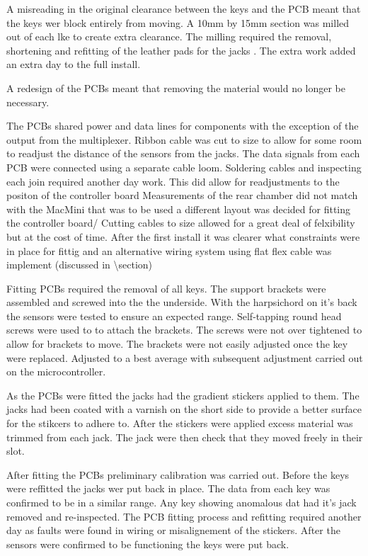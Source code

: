 A misreading in the original clearance between the keys and the PCB
meant that the keys wer block entirely from moving. A 10mm by 15mm
section was milled out of each lke \FIGURE to create extra clearance.
The milling required the removal, shortening and refitting of the
leather pads for the jacks \FIGURE. The extra work added an extra day to
the full install.

A redesign of the PCBs meant that removing the material would no longer
be necessary.

The PCBs shared power and data lines for components with the exception
of the output from the multiplexer. Ribbon cable was cut to size to
allow for some room to readjust the distance of the sensors from the
jacks. The data signals from each PCB were connected using a separate
cable loom. Soldering cables and inspecting each join required another
day work. This did allow for readjustments to the positon of the
controller board Measurements of the rear chamber did not match with the
MacMini that was to be used a different layout was decided for fitting
the controller board/ Cutting cables to size allowed for a great deal of
felxibility but at the cost of time. After the first install it was
clearer what constraints were in place for fittig and an alternative
wiring system using flat flex cable was implement (discussed in
\textbackslash section)

Fitting PCBs required the removal of all keys. The support brackets were
assembled and screwed into the the underside. With the harpsichord on
it's back the sensors were tested to ensure an expected range.
Self-tapping round head screws were used to to attach the brackets. The
screws were not over tightened to allow for brackets to move. The
brackets were not easily adjusted once the key were replaced. Adjusted
to a best average with subsequent adjustment carried out on the
microcontroller.

As the PCBs were fitted the jacks had the gradient stickers applied to
them. The jacks had been coated with a varnish on the short side to
provide a better surface for the stikcers to adhere to. After the
stickers were applied excess material was trimmed from each jack. The
jack were then check that they moved freely in their slot.

After fitting the PCBs preliminary calibration was carried out. Before
the keys were reffitted the jacks wer put back in place. The data from
each key was confirmed to be in a similar range. Any key showing
anomalous dat had it's jack removed and re-inspected. The PCB fitting
process and refitting required another day as faults were found in
wiring or misalignement of the stickers. After the sensors were
confirmed to be functioning the keys were put back.

